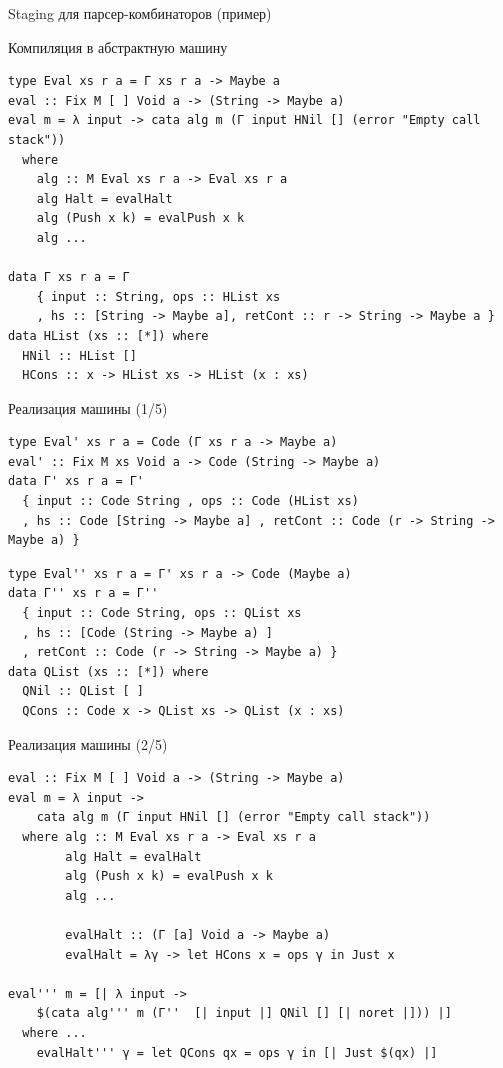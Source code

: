 \begin{frame}[t]{Staging для парсер-комбинаторов (пример)}
\end{frame}

\begin{frame}[fragile]{Компиляция в абстрактную машину}
\begin{verbatim}
type Eval xs r a = Γ xs r a -> Maybe a
eval :: Fix M [ ] Void a -> (String -> Maybe a)
eval m = λ input -> cata alg m (Γ input HNil [] (error "Empty call stack"))
  where
    alg :: M Eval xs r a -> Eval xs r a
    alg Halt = evalHalt
    alg (Push x k) = evalPush x k
    alg ...
    
data Γ xs r a = Γ 
    { input :: String, ops :: HList xs
    , hs :: [String -> Maybe a], retCont :: r -> String -> Maybe a }
data HList (xs :: [*]) where
  HNil :: HList []
  HCons :: x -> HList xs -> HList (x : xs)   
\end{verbatim}
\end{frame}


\begin{frame}[fragile]{Реализация машины (1/5)}
\begin{verbatim}
type Eval' xs r a = Code (Γ xs r a -> Maybe a) 
eval' :: Fix M xs Void a -> Code (String -> Maybe a)
data Γ' xs r a = Γ'
  { input :: Code String , ops :: Code (HList xs)
  , hs :: Code [String -> Maybe a] , retCont :: Code (r -> String -> Maybe a) }
\end{verbatim}
\vspace{1em}
\begin{verbatim}
type Eval'' xs r a = Γ' xs r a -> Code (Maybe a)
data Γ'' xs r a = Γ'' 
  { input :: Code String, ops :: QList xs
  , hs :: [Code (String -> Maybe a) ]
  , retCont :: Code (r -> String -> Maybe a) }
data QList (xs :: [*]) where
  QNil :: QList [ ]
  QCons :: Code x -> QList xs -> QList (x : xs)
\end{verbatim}
\end{frame}



\begin{frame}[fragile]{Реализация машины (2/5)}
\begin{verbatim}
eval :: Fix M [ ] Void a -> (String -> Maybe a)
eval m = λ input -> 
    cata alg m (Γ input HNil [] (error "Empty call stack"))
  where alg :: M Eval xs r a -> Eval xs r a
        alg Halt = evalHalt
        alg (Push x k) = evalPush x k
        alg ...

        evalHalt :: (Γ [a] Void a -> Maybe a)
        evalHalt = λγ -> let HCons x = ops γ in Just x

eval''' m = [| λ input -> 
    $(cata alg''' m (Γ''  [| input |] QNil [] [| noret |])) |]
  where ...
    evalHalt''' γ = let QCons qx = ops γ in [| Just $(qx) |]

\end{verbatim}

\end{frame}

